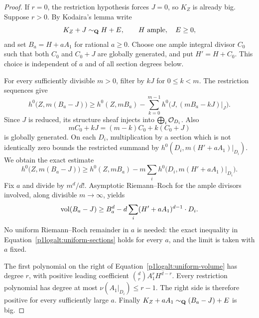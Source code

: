 \begin{proof}
If $r=0$, the restriction hypothesis forces $J=0$, so $K_Z$ is already
big.  Suppose $r>0$.  By Kodaira's lemma write
\[
 K_Z+J\sim_{\mathbf Q}H+E,\qquad H\text{ ample},\quad E\ge0,
\]
and set $B_a=H+aA_1$ for rational $a\ge0$.  Choose one ample integral
divisor $C_0$ such that both $C_0$ and $C_0+J$ are globally generated,
and put $H'=H+C_0$.  This choice is independent of $a$ and of all
section degrees below.

For every sufficiently divisible $m>0$, filter by $kJ$ for $0\le k<m$.
The restriction sequences give
\[
 h^0\bigl(Z,m(B_a-J)\bigr)
 \ge h^0(Z,mB_a)
 -\sum_{k=0}^{m-1}h^0\bigl(J,(mB_a-kJ)|_J\bigr).
\]
Since $J$ is reduced, its structure sheaf injects into
$\bigoplus_i\mathcal O_{D_i}$.  Also
\[
 mC_0+kJ=(m-k)C_0+k(C_0+J)
\]
is globally generated.  On each $D_i$, multiplication by a section
which is not identically zero bounds the restricted summand by
$h^0(D_i,m(H'+aA_1)|_{D_i})$.  We obtain the exact estimate
\begin{equation}\label{p1logalt:uniform-sections}
 h^0\bigl(Z,m(B_a-J)\bigr)
 \ge h^0(Z,mB_a)
 -m\sum_i h^0\bigl(D_i,m(H'+aA_1)|_{D_i}\bigr).
\end{equation}
Fix $a$ and divide by $m^d/d!$.  Asymptotic Riemann--Roch for the ample
divisors involved, along divisible $m\to\infty$, yields
\begin{equation}\label{p1logalt:uniform-volume}
 \operatorname{vol}(B_a-J)
 \ge B_a^d-d\sum_i(H'+aA_1)^{d-1}\cdot D_i.
\end{equation}
No uniform Riemann--Roch remainder in $a$ is needed: the exact
inequality in Equation~\eqref{p1logalt:uniform-sections} holds for every $a$, and the
limit is taken with $a$ fixed.

The first polynomial on the right of
Equation~\eqref{p1logalt:uniform-volume} has degree $r$, with positive leading
coefficient $\binom dr A_1^rH^{d-r}$.  Every restriction polynomial has
degree at most $\nu(A_1|_{D_i})\le r-1$.  The right side is therefore
positive for every sufficiently large $a$.  Finally
$K_Z+aA_1\sim_{\mathbf Q}(B_a-J)+E$ is big.
\end{proof}

